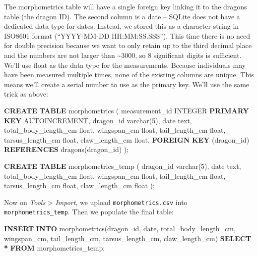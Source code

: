 \documentclass[
]{book}
\newenvironment{Shaded}{\begin{snugshade}}{\end{snugshade}}
\newcommand{\DataTypeTok}[1]{\textcolor[rgb]{0.13,0.29,0.53}{#1}}
\newcommand{\DecValTok}[1]{\textcolor[rgb]{0.00,0.00,0.81}{#1}}
\newcommand{\KeywordTok}[1]{\textcolor[rgb]{0.13,0.29,0.53}{\textbf{#1}}}
\newcommand{\NormalTok}[1]{#1}
\newcommand{\OperatorTok}[1]{\textcolor[rgb]{0.81,0.36,0.00}{\textbf{#1}}}
\begin{document}
The morphometrics table will have a single foreign key linking it to the dragons
table (the dragon ID). The second column is a date -- SQLite does not have a
dedicated data type for dates. Instead, we stored this as a character string in
ISO8601 format (``YYYY-MM-DD HH:MM:SS.SSS''). This time there is no need for
double precision because we want to only retain up to the third decimal place
and the numbers are not larger than \textasciitilde3000, so 8 significant digits is sufficient.
We'll use float as the data type for the measurements. Because individuals may
have been measured multiple times, none of the existing columns are unique. This
means we'll create a serial number to use as the primary key. We'll use the same
trick as above:

\begin{Shaded}
\begin{Highlighting}[]
\KeywordTok{CREATE} \KeywordTok{TABLE}\NormalTok{ morphometrics (}
\NormalTok{measurement\_id }\DataTypeTok{INTEGER} \KeywordTok{PRIMARY} \KeywordTok{KEY}\NormalTok{ AUTOINCREMENT,}
\NormalTok{dragon\_id }\DataTypeTok{varchar}\NormalTok{(}\DecValTok{5}\NormalTok{),}
\DataTypeTok{date}\NormalTok{ text,}
\NormalTok{total\_body\_length\_cm }\DataTypeTok{float}\NormalTok{,}
\NormalTok{wingspan\_cm }\DataTypeTok{float}\NormalTok{,}
\NormalTok{tail\_length\_cm }\DataTypeTok{float}\NormalTok{,}
\NormalTok{tarsus\_length\_cm }\DataTypeTok{float}\NormalTok{,}
\NormalTok{claw\_length\_cm }\DataTypeTok{float}\NormalTok{,}
\KeywordTok{FOREIGN} \KeywordTok{KEY}\NormalTok{ (dragon\_id) }\KeywordTok{REFERENCES}\NormalTok{ dragons(dragon\_id)}
\NormalTok{);}

\KeywordTok{CREATE} \KeywordTok{TABLE}\NormalTok{ morphometrics\_temp (}
\NormalTok{dragon\_id }\DataTypeTok{varchar}\NormalTok{(}\DecValTok{5}\NormalTok{),}
\DataTypeTok{date}\NormalTok{ text,}
\NormalTok{total\_body\_length\_cm }\DataTypeTok{float}\NormalTok{,}
\NormalTok{wingspan\_cm }\DataTypeTok{float}\NormalTok{,}
\NormalTok{tail\_length\_cm }\DataTypeTok{float}\NormalTok{,}
\NormalTok{tarsus\_length\_cm }\DataTypeTok{float}\NormalTok{,}
\NormalTok{claw\_length\_cm }\DataTypeTok{float}
\NormalTok{);}
\end{Highlighting}
\end{Shaded}

Now on \emph{Tools} \textgreater{} \emph{Import}, we upload \texttt{morphometrics.csv} into
\texttt{morphometrics\_temp}. Then we populate the final table:

\begin{Shaded}
\begin{Highlighting}[]
\KeywordTok{INSERT} \KeywordTok{INTO}\NormalTok{ morphometrics(dragon\_id, }\DataTypeTok{date}\NormalTok{, total\_body\_length\_cm, wingspan\_cm,}
\NormalTok{tail\_length\_cm, tarsus\_length\_cm, claw\_length\_cm) }
\KeywordTok{SELECT} \OperatorTok{*} \KeywordTok{FROM}\NormalTok{ morphometrics\_temp;}
\end{Highlighting}
\end{Shaded}
\end{document}
